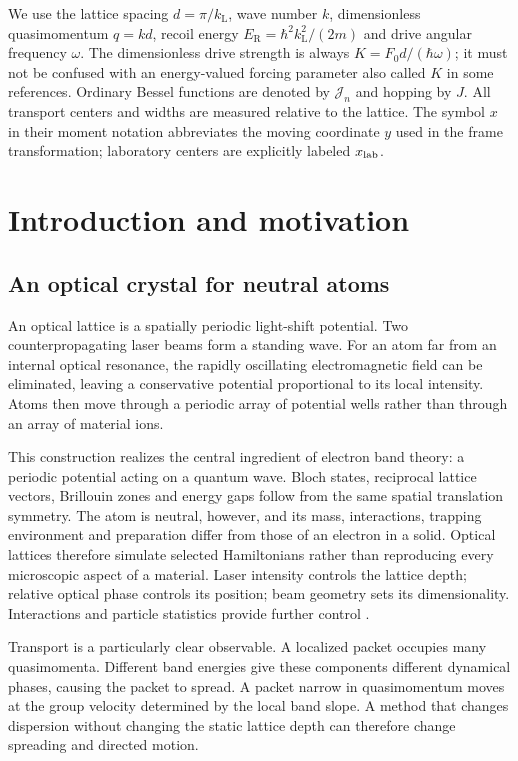 \documentclass[11pt,oneside]{report}
\numberwithin{equation}{chapter}
\newcommand{\ER}{E_{\mathrm R}}
\begin{document}
We use the lattice spacing $d=\pi/k_{\mathrm L}$, wave number $k$, dimensionless quasimomentum $q=kd$, recoil energy $\ER=\hbar^2 k_{\mathrm L}^2/(2m)$ and drive angular frequency $\omega$. The dimensionless drive strength is always $K=F_0d/(\hbar\omega)$; it must not be confused with an energy-valued forcing parameter also called $K$ in some references. Ordinary Bessel functions are denoted by $\mathcal J_n$ and hopping by $J$.
All transport centers and widths are measured relative to the lattice. The symbol $x$ in their moment notation abbreviates the moving coordinate $y$ used in the frame transformation; laboratory centers are explicitly labeled $x_{\rm lab}$.

\clearpage{}
\chapter{Introduction and motivation}
\section{An optical crystal for neutral atoms}
An optical lattice is a spatially periodic light-shift potential. Two counterpropagating laser beams form a standing wave. For an atom far from an internal optical resonance, the rapidly oscillating electromagnetic field can be eliminated, leaving a conservative potential proportional to its local intensity. Atoms then move through a periodic array of potential wells rather than through an array of material ions.

This construction realizes the central ingredient of electron band theory: a periodic potential acting on a quantum wave. Bloch states, reciprocal lattice vectors, Brillouin zones and energy gaps follow from the same spatial translation symmetry. The atom is neutral, however, and its mass, interactions, trapping environment and preparation differ from those of an electron in a solid. Optical lattices therefore simulate selected Hamiltonians rather than reproducing every microscopic aspect of a material. Laser intensity controls the lattice depth; relative optical phase controls its position; beam geometry sets its dimensionality. Interactions and particle statistics provide further control \cite{Jaksch1998,Bloch2008}.

Transport is a particularly clear observable. A localized packet occupies many quasimomenta. Different band energies give these components different dynamical phases, causing the packet to spread. A packet narrow in quasimomentum moves at the group velocity determined by the local band slope. A method that changes dispersion without changing the static lattice depth can therefore change spreading and directed motion.
\end{document}

